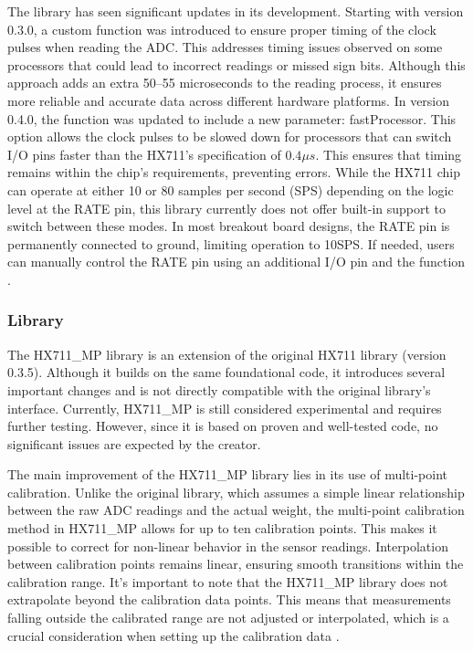 The library has seen significant updates in its development. Starting with version 0.3.0, a custom  function was introduced to ensure proper timing of the clock pulses when reading the ADC. This addresses timing issues observed on some processors that could lead to incorrect readings or missed sign bits. Although this approach adds an extra 50–55 microseconds to the reading process, it ensures more reliable and accurate data across different hardware platforms. In version 0.4.0, the  function was updated to include a new parameter: fastProcessor. This option allows the clock pulses to be slowed down for processors that can switch I/O pins faster than the HX711’s specification of $ 0.4 \mu s$. This ensures that timing remains within the chip’s requirements, preventing errors. While the HX711 chip can operate at either 10 or 80 samples per second (SPS) depending on the logic level at the RATE pin, this library currently does not offer built-in support to switch between these modes. In most breakout board designs, the RATE pin is permanently connected to ground, limiting operation to 10SPS. If needed, users can manually control the RATE pin using an additional I/O pin and the  function \cite[see][151-152]{Tillaart:2025}.

\subsubsection{Library }
The HX711\_MP library is an extension of the original HX711 library (version 0.3.5). Although it builds on the same foundational code, it introduces several important changes and is not directly compatible with the original library’s interface. Currently, HX711\_MP is still considered experimental and requires further testing. However, since it is based on proven and well-tested code, no significant issues are expected by the creator. 

The main improvement of the HX711\_MP library lies in its use of multi-point calibration. Unlike the original library, which assumes a simple linear relationship between the raw ADC readings and the actual weight, the multi-point calibration method in HX711\_MP allows for up to ten calibration points. This makes it possible to correct for non-linear behavior in the sensor readings. Interpolation between calibration points remains linear, ensuring smooth transitions within the calibration range. It’s important to note that the HX711\_MP library does not extrapolate beyond the calibration data points. This means that measurements falling outside the calibrated range are not adjusted or interpolated, which is a crucial consideration when setting up the calibration data \cite[see][151-152]{Tillaart:2024}.

